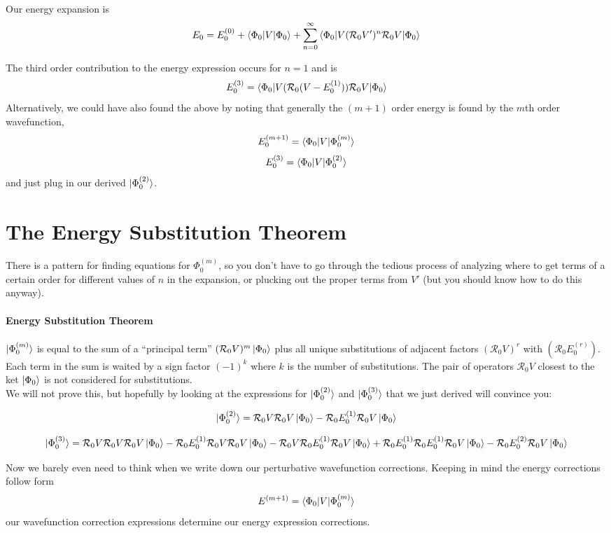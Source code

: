 \documentclass{article}
\newcommand{\Ezero}{E^{(0)}}
\newcommand{\Rz}{\mathcal{R}_{0}}
\newcommand{\Eone}{E^{(1)}}
\begin{document}
Our energy expansion is 
\[E_0 = \Ezero_0 + \braket{\Phi_0|V|\Phi_0} + \sum_{n=0}^{\infty} \braket{\Phi_0|V (\Rz V')^n \Rz V | \Phi_0}\]

The third order contribution to the energy expression occurs for $n=1$ and is 
\[ E_0^{(3)} = \braket{\Phi_0 | V ( \Rz (V - E_0^{(1)})) \Rz V | \Phi_0} \]
Alternatively, we could have also found the above by noting that generally the $(m+1)$ order energy is found
by the $m$th order wavefunction,
\[ E_0^{(m+1)} = \braket{\Phi_0 | V | \Phi_0^{(m)}} \]
\[ E_0^{(3)} = \braket{\Phi_0 | V | \Phi_0^{(2)}} \]
and just plug in our derived $\ket{\Phi_0^{(2)}}$.

\section{The Energy Substitution Theorem}
There is a pattern for finding equations for $\Phi_0^{(m)}$, so you don't have to
go through the tedious process of analyzing where to get terms of a certain order for different
values of $n$ in the expansion, or plucking out the proper terms from $V'$
(but you should know how to do this anyway).

\paragraph{\textbf{Energy Substitution Theorem}}
 $\ket{\Phi_0^{(m)}}$ is equal to the sum of a ``principal term'' 
 $(\Rz V)^m \ket{\Phi_0} $ plus all unique substitutions of 
adjacent factors $(\Rz V)^r$ with $(\Rz E_0^{(r)})$. Each term
in the sum is waited by a sign factor $(-1)^k$ where $k$ is the number of substitutions.
The pair of operators $\Rz V$ closest to the ket $\ket{\Phi_0}$ is not considered for substitutions. \\

We will not prove this, but hopefully by looking at the expressions for  $\ket{\Phi_0^{(2)}}$ and $\ket{\Phi_0^{(3)}}$ that we just derived will convince you:

\[\ket{\Phi_0^{(2)}} = \Rz V \Rz V \ket{\Phi_0} - \Rz \Eone_0 \Rz V \ket{\Phi_0}\]

\[\ket{\Phi_0^{(3)}} = \Rz V \Rz V \Rz V \ket{\Phi_0} - \Rz \Eone_0 \Rz V \Rz V \ket{\Phi_0} 
  - \Rz V \Rz \Eone_0 \Rz V \ket{\Phi_0} + \Rz E_0^{(1)} \Rz E_0^{(1)} \Rz V \ket{\Phi_0} 
 - \Rz E_0^{(2)} \Rz V \ket{\Phi_0} \]


Now we barely even need to think when we write down our perturbative wavefunction corrections.
Keeping in mind the energy corrections follow form
\[ E^{(m+1)} = \braket{\Phi_0 | V | \Phi_0^{(m)}} \]
our wavefunction correction expressions determine our energy expression corrections.
\end{document}

